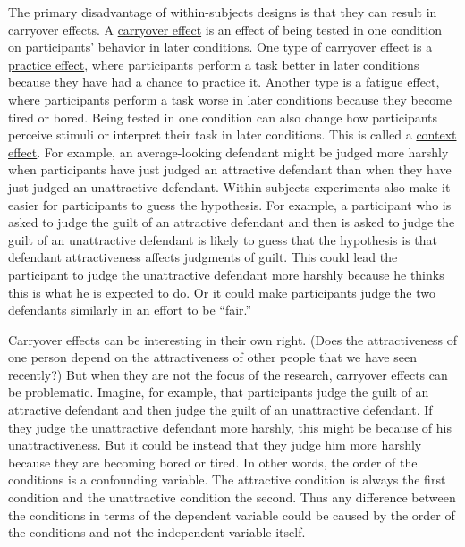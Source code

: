 \documentclass[
]{krantz}
\begin{document}
The primary disadvantage of within-subjects designs is that they can result in carryover effects. A \hyperref[carryover-effect]{carryover effect} is an effect of being tested in one condition on participants' behavior in later conditions. One type of carryover effect is a \hyperref[practice-effect]{practice effect}, where participants perform a task better in later conditions because they have had a chance to practice it. Another type is a \hyperref[fatigue-effect]{fatigue effect}, where participants perform a task worse in later conditions because they become tired or bored. Being tested in one condition can also change how participants perceive stimuli or interpret their task in later conditions. This is called a \hyperref[context-effect]{context effect}. For example, an average-looking defendant might be judged more harshly when participants have just judged an attractive defendant than when they have just judged an unattractive defendant. Within-subjects experiments also make it easier for participants to guess the hypothesis. For example, a participant who is asked to judge the guilt of an attractive defendant and then is asked to judge the guilt of an unattractive defendant is likely to guess that the hypothesis is that defendant attractiveness affects judgments of guilt. This could lead the participant to judge the unattractive defendant more harshly because he thinks this is what he is expected to do. Or it could make participants judge the two defendants similarly in an effort to be ``fair.''

Carryover effects can be interesting in their own right. (Does the attractiveness of one person depend on the attractiveness of other people that we have seen recently?) But when they are not the focus of the research, carryover effects can be problematic. Imagine, for example, that participants judge the guilt of an attractive defendant and then judge the guilt of an unattractive defendant. If they judge the unattractive defendant more harshly, this might be because of his unattractiveness. But it could be instead that they judge him more harshly because they are becoming bored or tired. In other words, the order of the conditions is a confounding variable. The attractive condition is always the first condition and the unattractive condition the second. Thus any difference between the conditions in terms of the dependent variable could be caused by the order of the conditions and not the independent variable itself.
\end{document}
